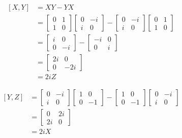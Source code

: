 \begin{align*}
	\left[X, Y \right] &=XY - YX\\
		&= \begin{bmatrix}
		0 & 1 \\
		1 & 0
		\end{bmatrix}
		\begin{bmatrix}
		0 & -i \\
		i & 0
		\end{bmatrix}
		-
		\begin{bmatrix}
		0 & -i \\
		i & 0
		\end{bmatrix}
		\begin{bmatrix}
		0 & 1 \\
		1 & 0
		\end{bmatrix} \\
%
		&=
%
		\begin{bmatrix}
			i & 0 \\
			0 & -i
		\end{bmatrix}
		-
		\begin{bmatrix}
			-i & 0 \\
			0 & i
		\end{bmatrix}\\
%
		&=
%
		\begin{bmatrix}
			2i & 0 \\
			0 & -2i
		\end{bmatrix} \\
%
		&=	2i Z
\end{align*}



\begin{align*}
	\left[Y, Z \right] &= \begin{bmatrix}
		0 & -i \\
		i & 0
	\end{bmatrix}
	\begin{bmatrix}
		1 & 0 \\
		0 & -1
	\end{bmatrix}
	-
	\begin{bmatrix}
		1 & 0 \\
		0 & -1
	\end{bmatrix}
	\begin{bmatrix}
		0 & -i \\
		i & 0
	\end{bmatrix}\\
	&=
	\begin{bmatrix}
		0 & 2i \\
		2i & 0
	\end{bmatrix}\\
	&= 2iX
\end{align*}



